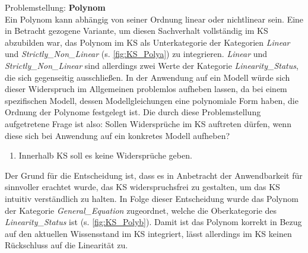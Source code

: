 Problemstellung: \textbf{Polynom}\\
Ein Polynom kann abhängig von seiner Ordnung linear oder nichtlinear sein. Eine in Betracht gezogene Variante, um diesen Sachverhalt vollständig im KS abzubilden war, das Polynom im KS als Unterkategorie der Kategorien \textit{Linear} und \textit{Strictly\_Non\_Linear} (s. \autoref{fig:KS_Polya}) zu integrieren. \textit{Linear} und \textit{Strictly\_Non\_Linear} sind allerdings zwei Werte der Kategorie \textit{Linearity\_Status}, die sich gegenseitig ausschließen. In der Anwendung auf ein Modell würde sich dieser Widerspruch im Allgemeinen problemlos aufheben lassen, da bei einem spezifischen Modell, dessen Modellgleichungen eine polynomiale Form haben, die Ordnung der Polynome festgelegt ist. Die durch diese Problemstellung aufgetretene Frage ist also: Sollen Widersprüche im KS auftreten dürfen, wenn diese sich bei Anwendung auf ein konkretes Modell aufheben?
\begin{enumerate}[resume*]
	\item \label{E.KS_Widersprüche}Innerhalb KS soll es keine Widersprüche geben.
\end{enumerate}
Der Grund für die Entscheidung ist, dass es in Anbetracht der Anwendbarkeit für sinnvoller erachtet wurde, das KS widerspruchsfrei zu gestalten, um das KS intuitiv verständlich zu halten. In Folge dieser Entscheidung wurde das Polynom der Kategorie \textit{General\_Equation} zugeordnet, welche die Oberkategorie des \textit{Linearity\_Status} ist (s. \autoref{fig:KS_Polyb}). Damit ist das Polynom korrekt in Bezug auf den aktuellen Wissensstand im KS integriert, lässt allerdings im KS keinen Rückschluss auf die Linearität zu.

